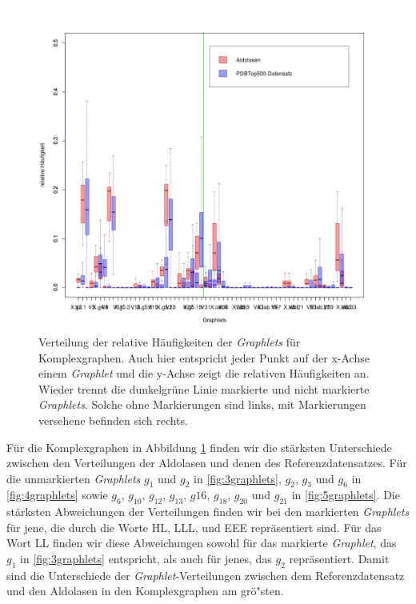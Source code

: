\documentclass{report}
\begin{document}
\begin{figure}
\label{fig:cgplot}
\includegraphics[scale=0.55]{cg_plot.png}
\caption{Verteilung der relative H\"aufigkeiten der \textit{Graphlets} f\"ur Komplexgraphen. Auch hier entspricht jeder Punkt auf der x-Achse einem \textit{Graphlet} und die y-Achse zeigt die relativen H\"aufigkeiten an. Wieder trennt die dunkelgr\"une Linie markierte und nicht markierte \textit{Graphlets}. Solche ohne Markierungen sind links, mit Markierungen versehene befinden sich rechts.}
\end{figure}

F\"ur die Komplexgraphen in Abbildung \ref{fig:cgplot} finden wir die st\"arksten Unterschiede zwischen den Verteilungen der Aldolasen und denen des Referenzdatensatzes. F\"ur die unmarkierten \textit{Graphlets} $g_1$ und $g_2$ in \ref{fig:3graphlets}, $g_2$, $g_3$ und $g_6$ in \ref{fig:4graphlets} sowie $g_6$, $g_{10}$, $g_{12}$, $g_{13}$, $g{16}$, $g_{18}$, $g_{20}$ und $g_{21}$ in \ref{fig:5graphlets}.
Die st\"arksten Abweichungen der Verteilungen finden wir bei den markierten \textit{Graphlets} f\"ur jene, die durch die Worte HL, LLL, und EEE repr\"asentiert sind. F\"ur das Wort LL finden wir diese Abweichungen sowohl f\"ur das markierte \textit{Graphlet}, das $g_1$ in \ref{fig:3graphlets} entspricht, als auch f\"ur jenes, das $g_2$ repr\"asentiert.
Damit sind die Unterschiede der \textit{Graphlet}-Verteilungen zwischen dem Referenzdatensatz und den Aldolasen in den Komplexgraphen am gr\"o"sten.
\end{document}
